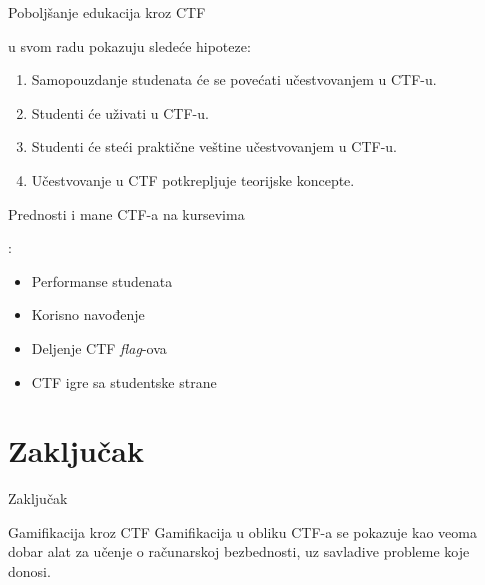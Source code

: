\documentclass[aspectratio=169,xcolor=dvipsnames]{beamer}
\begin{document}

\begin{frame}{Poboljšanje edukacija kroz CTF}

    \cite{ctfleune} u svom radu pokazuju sledeće hipoteze:
    \begin{enumerate}
        \item Samopouzdanje studenata će se povećati učestvovanjem u CTF-u.
        \item Studenti će uživati u CTF-u.
        \item Studenti će steći praktične veštine učestvovanjem u CTF-u.
        \item Učestvovanje u CTF potkrepljuje teorijske koncepte.
    \end{enumerate}

\end{frame}


\begin{frame}{Prednosti i mane CTF-a na kursevima}

    \cite{ctfuni}:
    \begin{itemize}
        \item Performanse studenata
        \item Korisno navođenje
        \item Deljenje CTF \emph{flag}-ova
        \item CTF igre sa studentske strane
    \end{itemize}

\end{frame}

\section{Zaključak}

\begin{frame}{Zaključak}
    \begin{alertblock}{Gamifikacija kroz CTF}
        Gamifikacija u obliku CTF-a se pokazuje kao veoma dobar alat za 
        učenje o računarskoj bezbednosti, uz savladive probleme koje donosi.
    \end{alertblock}
\end{frame}
\end{document}
